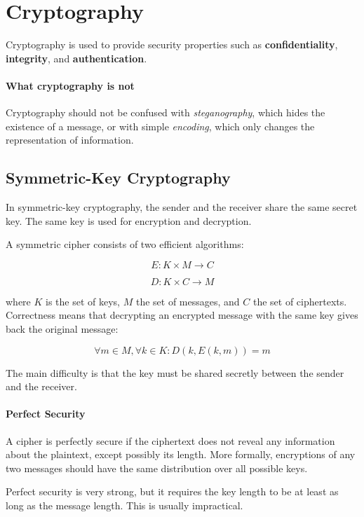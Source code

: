 \section{Cryptography}

Cryptography is used to provide security properties such as
\textbf{confidentiality}, \textbf{integrity}, and \textbf{authentication}.


\paragraph{What cryptography is not}
Cryptography should not be confused with \emph{steganography}, which
hides the existence of a message, or with simple \emph{encoding}, which
only changes the representation of information.

\subsection{Symmetric-Key Cryptography}

In symmetric-key cryptography, the sender and the receiver share the
same secret key. The same key is used for encryption and decryption.

A symmetric cipher consists of two efficient algorithms:

\[
E : K \times M \rightarrow C
\]

\[
D : K \times C \rightarrow M
\]

where $K$ is the set of keys, $M$ the set of messages, and $C$ the set
of ciphertexts. Correctness means that decrypting an encrypted message
with the same key gives back the original message:

\[
\forall m \in M, \forall k \in K :
D(k, E(k,m)) = m
\]

The main difficulty is that the key must be shared secretly between the
sender and the receiver.

\paragraph{Perfect Security}

A cipher is perfectly secure if the ciphertext does not reveal any
information about the plaintext, except possibly its length. More
formally, encryptions of any two messages should have the same
distribution over all possible keys.

Perfect security is very strong, but it requires the key length to be at
least as long as the message length. This is usually impractical.

